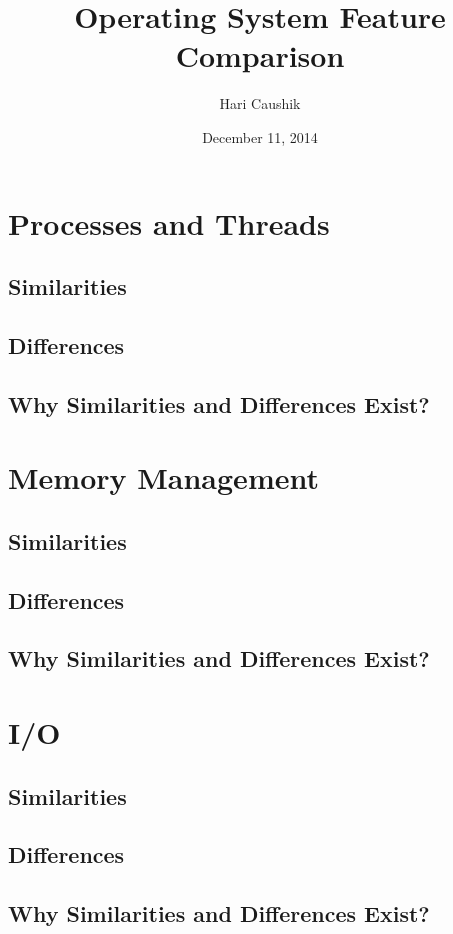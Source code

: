 \documentclass[letterpaper,10pt,titlepage]{article}
\title{Operating System Feature Comparison}
\date{December 11, 2014}
\author{Hari Caushik}
\begin{document}
\tableofcontents
\newpage

\section{Processes and Threads}
\subsection{Similarities}
\subsection{Differences}
\subsection{Why Similarities and Differences Exist?}
\section{Memory Management}
\subsection{Similarities}
\subsection{Differences}
\subsection{Why Similarities and Differences Exist?}
\section{I/O}
\subsection{Similarities}
\subsection{Differences}
\subsection{Why Similarities and Differences Exist?}
%
\end{document}
